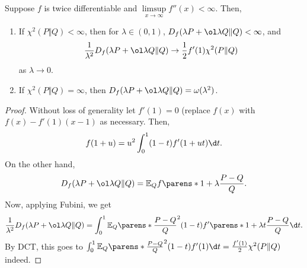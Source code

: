 \begin{thm}
	Suppose $f$ is twice differentiable and $\limsup\limits_{x\to \infty} f''(x) < \infty$. Then, 
	\begin{enumerate}
		\item If $\chi^2(P\Vert Q)< \infty$, then for $\lambda \in (0,1)$, $D_f(\lambda P + \ol \lambda Q \Vert Q) < \infty$, and \[
				\frac 1{\lambda^2} D_f(\lambda P + \ol \lambda Q \Vert Q) \to \frac 12 f'(1) \chi^2(P\Vert Q)
			\]
			as $\lambda \to 0$.
		\item If $\chi^2(P\Vert Q) = \infty$, then $D_f(\lambda P + \ol \lambda Q \Vert Q) = \omega(\lambda^2)$.
	\end{enumerate}
\end{thm}

\begin{proof}
	Without loss of generality let $f'(1) = 0$ (replace $f(x)$ with $f(x) - f'(1) (x-1)$ as necessary. Then, \[
		f(1+u) = u^2 \int_0^1 (1-t) f'(1+ut)\d t.
	\]
	On the other hand, \[
		D_f(\lambda P + \ol \lambda Q \Vert Q) = \mathbb E_Q f\parens*{1 + \lambda \frac{P-Q}{Q}}.
	\]
	Now, applying Fubini, we get \[
		\frac 1{\lambda^2} D_f(\lambda P + \ol \lambda Q\Vert Q) = \int_0^1 \mathbb E_Q \parens*{\frac{P-Q}Q}^2 (1-t) f'\parens*{1 + \lambda t\frac{P-Q}{Q}} \d t.
	\]
	By DCT, this goes to $\int_0^1 \mathbb E_Q \parens*{\frac{P-Q}Q}^2 (1-t) f'(1) \d t = \frac{f'(1)}{2}\chi^2(P\Vert Q)$ indeed.
\end{proof}
